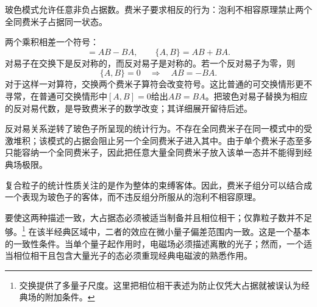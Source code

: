 玻色模式允许任意非负占据数。费米子要求相反的行为：泡利不相容原理禁止两个全同费米子占据同一状态。

\begin{classroomqa}
\end{classroomqa}

两个乘积相差一个符号：
\begin{equation}
[A,B]=AB-BA,
\qquad
\{A,B\}=AB+BA.
\end{equation}
对易子在交换下是反对称的，而反对易子是对称的。若一个反对易子为零，则
\begin{equation}
\{A,B\}=0
\quad\Longrightarrow\quad
AB=-BA.
\end{equation}
对于这样一对算符，交换两个费米子算符会改变符号。这比普通的可交换情形更不寻常，在普通可交换情形中\([A,B]=0\)给出\(AB=BA\)。把玻色对易子替换为相应的反对易代数，是导致费米子的数学改变；其详细展开留待后述。

反对易关系逆转了玻色子所呈现的统计行为。不存在全同费米子在同一模式中的受激堆积；该模式的占据会阻止另一个全同费米子进入其中。由于单个费米子态至多只能容纳一个全同费米子，因此把任意大量全同费米子放入该单一态并不能得到经典场极限。

\begin{classroomqa}
\end{classroomqa}

复合粒子的统计性质关注的是作为整体的束缚客体。因此，费米子组分可以结合成一个表现为玻色子的客体，而不违反组分所服从的泡利不相容原理。

\begin{classroomqa}
\end{classroomqa}

要使这两种描述一致，大占据态必须被适当制备并且相位相干；仅靠粒子数并不足够。\footnote{交换提供了多量子尺度。这里把相位相干表述为防止仅凭大占据就被误认为经典场的附加条件。} 在该半经典区域中，二者的效应在微小量子偏差范围内一致。这是一个基本的一致性条件。当单个量子起作用时，电磁场必须描述离散的光子；然而，一个适当相位相干且包含大量光子的态必须重现经典电磁波的熟悉作用。
